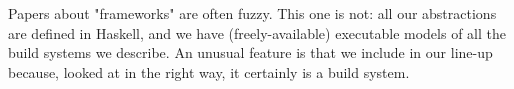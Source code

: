 Papers about "frameworks" are often fuzzy.  This one is not: all our
abstractions are defined in Haskell, and we have (freely-available)
executable models of all the build systems we describe.  An unusual
feature is that we include \Excel in our line-up because, looked at
in the right way, it certainly is a build system.

